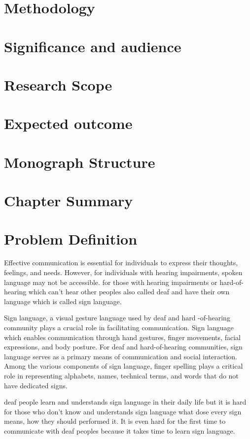 \section{Methodology}
\lipsum[4]
\lipsum[4]
\lipsum[4]
\lipsum[4]
\lipsum[4]
\lipsum[4]
\lipsum[4]
\lipsum[4]
\lipsum[4]
\lipsum[4]
\section{Significance and audience}
\section{Research Scope}
\section{Expected outcome}
\section{Monograph Structure}
\section{Chapter Summary}

\section{Problem Definition}

Effective communication is essential for individuals to express their thoughts, feelings, and needs. However, for individuals with hearing impairments, spoken language may not be accessible. for those with hearing impairments or hard-of-hearing which can't hear other peoples also called deaf and have their own language which is called sign language.


Sign language, a visual gesture language used by deaf and hard -of-hearing community plays a crucial role in facilitating communication. Sign language which enables communication through hand gestures, finger movements, facial expressions, and body posture. For deaf and hard-of-hearing communities, sign language serves as a primary means of communication and social interaction. Among the various components of sign language, finger spelling plays a critical role in representing alphabets, names, technical terms, and words that do not have dedicated signs.


deaf people learn and understands sign language in their daily life but it is hard for those who don't know and understands sign language what dose every sign means, how they should performed it. It is even hard for the first time to communicate with deaf peoples because it takes time to learn sign language.

